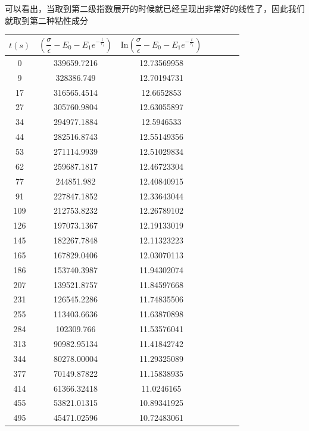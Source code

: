 \documentclass[ctex]{article}
\begin{document}
可以看出，当取到第二级指数展开的时候就已经呈现出非常好的线性了，因此我们就取到第二种粘性成分
\begin{table}[H]
    \centering
    \begin{tabular}{|c |c| c| c |c |c| c|}
\hline
 $t(s)$ &$\left(\dfrac{\sigma}{\epsilon}-E_0-E_1e^{-\frac{t}{\tau_1}}\right)$ & $ \mathrm{In}\left(\dfrac{\sigma}{\epsilon}-E_0-E_1e^{-\frac{t}{\tau_1}}\right)$\\
\hline
0 & 339659.7216 & 12.73569958 \\ \hline
        9 & 328386.749 & 12.70194731 \\ \hline
        17 & 316565.4514 & 12.6652853 \\ \hline
        27 & 305760.9804 & 12.63055897 \\ \hline
        34 & 294977.1884 & 12.5946533 \\ \hline
        44 & 282516.8743 & 12.55149356 \\ \hline
        53 & 271114.9939 & 12.51029834 \\ \hline
        62 & 259687.1817 & 12.46723304 \\ \hline
        77 & 244851.982 & 12.40840915 \\ \hline
        91 & 227847.1852 & 12.33643044 \\ \hline
        109 & 212753.8232 & 12.26789102 \\ \hline
        126 & 197073.1367 & 12.19133019 \\ \hline
        145 & 182267.7848 & 12.11323223 \\ \hline
        165 & 167829.0406 & 12.03070113 \\ \hline
        186 & 153740.3987 & 11.94302074 \\ \hline
        207 & 139521.8757 & 11.84597668 \\ \hline
        231 & 126545.2286 & 11.74835506 \\ \hline
        255 & 113403.6636 & 11.63870898 \\ \hline
        284 & 102309.766 & 11.53576041 \\ \hline
        313 & 90982.95134 & 11.41842742 \\ \hline
        344 & 80278.00004 & 11.29325089 \\ \hline
        377 & 70149.87822 & 11.15838935 \\ \hline
        414 & 61366.32418 & 11.0246165 \\ \hline
        455 & 53821.01315 & 10.89341925 \\ \hline
        495 & 45471.02596 & 10.72483061 \\ \hline

\end{tabular}
\end{table}
\end{document}
